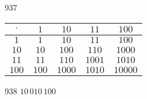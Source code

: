 \begin{Vastaus}{937}
\begin{tabular}{|c||c|c|c|c|}
	\hline
	$\cdot$ & $1$ & $10$ & $11$ & $100$ \\
	\hline
	\hline
	$1$ & $1$ & $10$ & $11$ & $100$ \\
	\hline
	$10$ & $10$ & $100$ & $110$ & $1000$  \\
	\hline
	$11$ & $11$ & $110$ & $1001$ & $1010$ \\
	\hline
	$100$ & $100$ & $1000$ & $1010$ & $10000$ \\
	\hline
	\end{tabular}
	
\end{Vastaus}
\begin{Vastaus}{938}
		$10\,010\,100$
	
\end{Vastaus}
